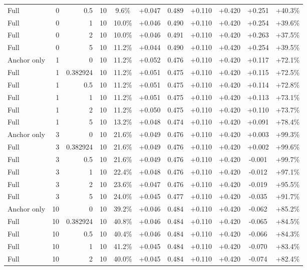 \begin{table}[htbp]
\begin{tabular}{lrrrccccccc}
Full & 0 & 0.5 & 10 & 9.6\% & +0.047 & 0.489 & +0.110 & +0.420 & +0.251 & +40.3\% \\
Full & 0 & 1 & 10 & 10.0\% & +0.046 & 0.490 & +0.110 & +0.420 & +0.254 & +39.6\% \\
Full & 0 & 2 & 10 & 10.0\% & +0.046 & 0.491 & +0.110 & +0.420 & +0.263 & +37.5\% \\
Full & 0 & 5 & 10 & 11.2\% & +0.044 & 0.490 & +0.110 & +0.420 & +0.254 & +39.5\% \\
Anchor only & 1 & 0 & 10 & 11.2\% & +0.052 & 0.476 & +0.110 & +0.420 & +0.117 & +72.1\% \\
Full & 1 & 0.382924 & 10 & 11.2\% & +0.051 & 0.475 & +0.110 & +0.420 & +0.115 & +72.5\% \\
Full & 1 & 0.5 & 10 & 11.2\% & +0.051 & 0.475 & +0.110 & +0.420 & +0.114 & +72.8\% \\
Full & 1 & 1 & 10 & 11.2\% & +0.051 & 0.475 & +0.110 & +0.420 & +0.113 & +73.1\% \\
Full & 1 & 2 & 10 & 11.2\% & +0.050 & 0.475 & +0.110 & +0.420 & +0.110 & +73.7\% \\
Full & 1 & 5 & 10 & 13.2\% & +0.048 & 0.474 & +0.110 & +0.420 & +0.091 & +78.4\% \\
Anchor only & 3 & 0 & 10 & 21.6\% & +0.049 & 0.476 & +0.110 & +0.420 & +0.003 & +99.3\% \\
Full & 3 & 0.382924 & 10 & 21.6\% & +0.049 & 0.476 & +0.110 & +0.420 & +0.002 & +99.6\% \\
Full & 3 & 0.5 & 10 & 21.6\% & +0.049 & 0.476 & +0.110 & +0.420 & -0.001 & +99.7\% \\
Full & 3 & 1 & 10 & 22.4\% & +0.048 & 0.476 & +0.110 & +0.420 & -0.012 & +97.1\% \\
Full & 3 & 2 & 10 & 23.6\% & +0.047 & 0.476 & +0.110 & +0.420 & -0.019 & +95.5\% \\
Full & 3 & 5 & 10 & 24.0\% & +0.045 & 0.477 & +0.110 & +0.420 & -0.035 & +91.7\% \\
Anchor only & 10 & 0 & 10 & 39.2\% & +0.046 & 0.484 & +0.110 & +0.420 & -0.062 & +85.2\% \\
Full & 10 & 0.382924 & 10 & 40.8\% & +0.046 & 0.484 & +0.110 & +0.420 & -0.065 & +84.5\% \\
Full & 10 & 0.5 & 10 & 40.4\% & +0.046 & 0.484 & +0.110 & +0.420 & -0.066 & +84.3\% \\
Full & 10 & 1 & 10 & 41.2\% & +0.045 & 0.484 & +0.110 & +0.420 & -0.070 & +83.4\% \\
Full & 10 & 2 & 10 & 40.0\% & +0.045 & 0.484 & +0.110 & +0.420 & -0.074 & +82.4\% \\

\end{tabular}
\end{table}

